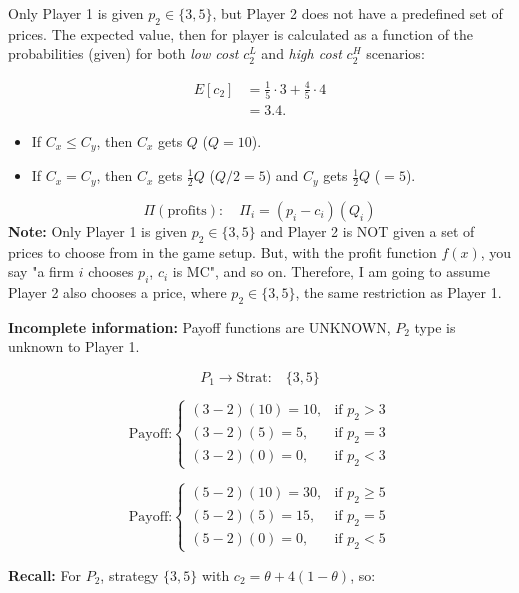 \documentclass{article}
\begin{document}
Only Player 1 is given \( p_2 \in \{3, 5\} \), but Player 2 does not have a predefined set of prices. The expected value, then for player is calculated as a function of the probabilities (given) for both \textit{low cost} $c_2^L$ and \textit{high cost} $c_2^H$ scenarios:

\begin{align*}
    E[c_2] &= \frac{1}{5} \cdot 3 + \frac{4}{5} \cdot 4 \\
         &= 3.4.
\end{align*}

\begin{itemize}
    \item If \( C_x \leq C_y \), then \( C_x \) gets \( Q \) (\( Q = 10 \)).
    \item If \( C_x = C_y \), then \( C_x \) gets \( \frac{1}{2} Q \) (\( Q/2 = 5 \)) and \( C_y \) gets \( \frac{1}{2} Q \) (\( = 5 \)).
\end{itemize}

\[
\Pi (\text{profits}): \quad \Pi_i = (p_i - c_i)(Q_i)
\]
\vspace{2mm}
\textbf{Note:} Only Player 1 is given \( p_2 \in \{3,5\} \) and Player 2 is NOT given a set of prices to choose from in the game setup. But, with the profit function \( f(x) \), you say "a firm \( i \) chooses \( p_i \), \( c_i \) is MC", and so on. Therefore, I am going to assume Player 2 also chooses a price, where \( p_2 \in \{3,5\} \), the same restriction as Player 1. 
\vspace{2mm}

\textbf{Incomplete information:} Payoff functions are UNKNOWN, \( P_2 \) type is unknown to Player 1.

\[
P_1 \to \text{Strat:} \quad \{3,5\}
\]

\[
\text{Payoff:} 
\begin{cases}
    (3 - 2)(10) = 10, & \text{if } p_2 > 3 \\
    (3 - 2)(5) = 5, & \text{if } p_2 = 3 \\
    (3 - 2)(0) = 0, & \text{if } p_2 < 3
\end{cases}
\]

\[
\text{Payoff:}
\begin{cases}
    (5 - 2)(10) = 30, & \text{if } p_2 \geq 5 \\
    (5 - 2)(5) = 15, & \text{if } p_2 = 5 \\
    (5 - 2)(0) = 0, & \text{if } p_2 < 5
\end{cases}
\]

\textbf{Recall:} For \( P_2 \), strategy \( \{3,5\} \) with \( c_2 = \theta + 4(1 - \theta) \), so:
\end{document}

